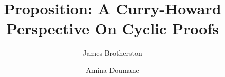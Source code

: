 
\makeindex


\title{
 Proposition:  A Curry-Howard Perspective On Cyclic Proofs 
}



\author{James Brotherston  \and  Amina Doumane}





\maketitle

\begin{abstract}
  
\end{abstract}









